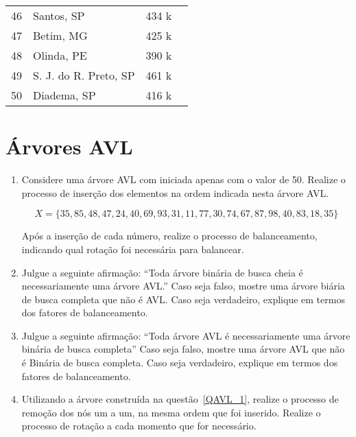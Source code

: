 \documentclass[12pt]{article}
\begin{document}
\begin{enumerate}[label=\textbf{Q\arabic*}]
\begin{minipage}{0.50\textwidth}
\begin{tabular}{@{}clcr@{}}
                  46      & Santos, SP             & 434 k \\
                  47      & Betim, MG              & 425 k \\
                  48      & Olinda, PE             & 390 k \\
                  49      & S. J. do R. Preto, SP  & 461 k \\
                  50      & Diadema, SP            & 416 k \\
                  \bottomrule
              \end{tabular}
          \end{minipage}
\end{enumerate}
\section{Árvores AVL}
\begin{enumerate}[resume,label=\textbf{Q\arabic*}]
    \item Considere uma árvore AVL com iniciada apenas com o valor de 50. Realize o processo de inserção dos elementos na ordem indicada nesta árvore AVL.\label{QAVL_1}

          $$X = \{35,85,48,47,24,40,69,93,31,11,77,30,74,67,87,98,40,83,18,35\}$$

          Após a inserção de cada número, realize o processo de balanceamento, indicando qual rotação foi necessária para balancear.

    \item Julgue a seguinte afirmação: ``Toda árvore binária de busca cheia é necessariamente uma árvore AVL.'' Caso seja falso, mostre uma árvore biária de busca completa que não é AVL. Caso seja verdadeiro, explique em termos dos fatores de balanceamento.

    \item Julgue a seguinte afirmação: ``Toda árvore AVL é necessariamente uma árvore binária de busca completa'' Caso seja falso, mostre uma árvore AVL que não é Binária de busca completa. Caso seja verdadeiro, explique em termos dos fatores de balanceamento.

    \item Utilizando a árvore construída na questão~\ref{QAVL_1}, realize o processo de remoção dos nós um a um, na mesma ordem que foi inserido. Realize o processo de rotação a cada momento que for necessário.

\end{enumerate}
\end{document}
